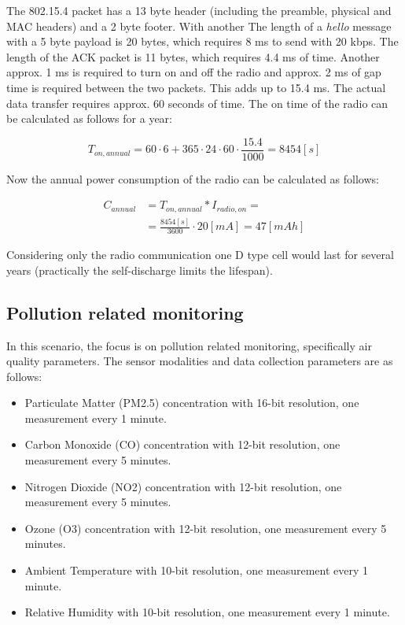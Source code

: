 \documentclass[conference]{IEEEtran}
\begin{document}
The 802.15.4 packet has a 13 byte header (including the preamble,
physical and MAC headers) and a 2 byte footer. With another
The length of a \emph{hello} message with a 5 byte payload is
20 bytes, which requires 8 ms to send with 20 kbps. The length of
the ACK packet is 11 bytes, which requires 4.4 ms of time.
Another approx. 1
ms is required to turn on and off the radio and approx. 2 ms
of gap time is required between the two packets. This adds up
to 15.4 ms. 
The actual data transfer requires approx. 60 seconds of time.
The on time of the radio can be calculated as follows for a year:

\begin{equation}
    T_{on,annual} = 60 \cdot 6 + 365 \cdot 24 \cdot 60 \cdot \frac{15.4}{1000} = 8454 [s]
\end{equation}

Now the annual power consumption of the radio can be calculated as
follows:

\begin{align}
    C_{annual} &= T_{on,annual} * I_{radio,on} = \\
     &= \frac{8454 [s]}{3600} \cdot 20 [mA] = 47 [mAh]
\end{align}

Considering only the radio communication one D type cell would last for
several years (practically the self-discharge limits the lifespan).

\subsection{Pollution related monitoring}

In this scenario, the focus is on pollution related monitoring, specifically
air quality parameters. The sensor modalities and data
collection parameters are as follows:

\begin{itemize}
	\item{Particulate Matter (PM2.5) concentration with 16-bit resolution, one measurement every 1 minute.}
	\item{Carbon Monoxide (CO) concentration with 12-bit resolution, one measurement every 5 minutes.}
	\item{Nitrogen Dioxide (NO2) concentration with 12-bit resolution, one measurement every 5 minutes.}
	\item{Ozone (O3) concentration with 12-bit resolution, one measurement every 5 minutes.}
	\item{Ambient Temperature with 10-bit resolution, one measurement every 1 minute.}
	\item{Relative Humidity with 10-bit resolution, one measurement every 1 minute.}
\end{itemize}
\end{document}

